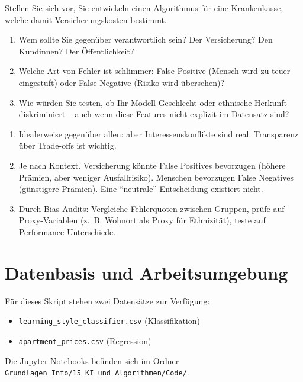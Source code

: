\begin{mychallenge}
Stellen Sie sich vor, Sie entwickeln einen Algorithmus für eine Krankenkasse, welche damit Versicherungskosten bestimmt.
\begin{enumerate}
    \item Wem sollte Sie gegenüber verantwortlich sein? Der Versicherung? Den Kundinnen? Der Öffentlichkeit?
    \item Welche Art von Fehler ist schlimmer: False Positive (Mensch wird zu teuer eingestuft) oder False Negative (Risiko wird übersehen)?
    \item Wie würden Sie testen, ob Ihr Modell Geschlecht oder ethnische Herkunft diskriminiert -- auch wenn diese Features nicht explizit im Datensatz sind?
\end{enumerate}
\begin{myanswer}
    \begin{enumerate}
        \item Idealerweise gegenüber allen: aber Interessenskonflikte sind real. Transparenz über Trade-offs ist wichtig.
        \item Je nach Kontext. Versicherung könnte False Positives bevorzugen (höhere Prämien, aber weniger Ausfallrisiko). Menschen bevorzugen False Negatives (günstigere Prämien). Eine \enquote{neutrale} Entscheidung existiert nicht.
        \item Durch Bias-Audits: Vergleiche Fehlerquoten zwischen Gruppen, prüfe auf Proxy-Variablen (z.~B. Wohnort als Proxy für Ethnizität), teste auf Performance-Unterschiede.
    \end{enumerate}
\end{myanswer}
\end{mychallenge}

\section{Datenbasis und Arbeitsumgebung}

Für dieses Skript stehen zwei Datensätze zur Verfügung:
\begin{itemize}
    \item \texttt{learning\_style\_classifier.csv} (Klassifikation)
    \item \texttt{apartment\_prices.csv} (Regression)
\end{itemize}

Die Jupyter-Notebooks befinden sich im Ordner \texttt{Grundlagen\_Info/15\_KI\_und\_Algorithmen/Code/}.
